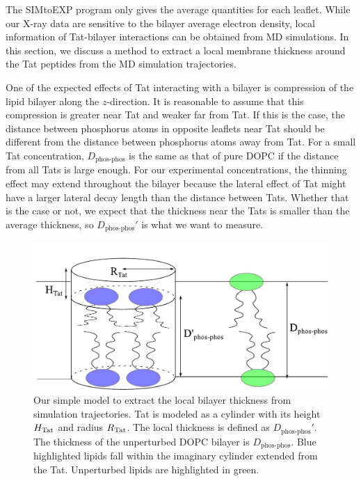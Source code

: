 The SIMtoEXP program only gives the average quantities for each leaflet. 
While our X-ray data are sensitive to the bilayer average electron density,
local information of Tat-bilayer interactions can be obtained from MD simulations.
In this section, we discuss a method to extract a local membrane thickness
around the Tat peptides from the MD simulation trajectories. 

One of the expected effects of Tat interacting with a bilayer is 
compression of the lipid bilayer along the $z$-direction. It is 
reasonable to assume that this compression is greater near Tat and
weaker far from Tat.
If this is the case, the distance between phosphorus atoms in opposite
leaflets near Tat should be different from the distance between
phosphorus atoms away from Tat.  
For a small Tat concentration, $D_\textrm{phos-phos}$ is the same as that of 
pure DOPC if the distance from all Tats is large enough.  
For our experimental concentrations, the thinning effect may extend throughout 
the bilayer because the lateral effect of Tat might have a larger lateral decay 
length than the distance between Tats. Whether that is the case or not, we 
expect that the thickness near the Tats is smaller than the average thickness,
so $D_\textrm{phos-phos}'$ is what we want to measure. 

\begin{figure}[htbp]
  \centering
  \includegraphics[scale=0.5]{./figures/Tat/cylinder_model}
  \caption{Our simple model to extract the local bilayer thickness from 
  simulation trajectories. Tat is modeled as a cylinder with its height $H_\textrm{Tat}$ 
  and radius $R_\textrm{Tat}$. The local thickness is defined as $D_\textrm{phos-phos}'$. 
  The thickness of the unperturbed DOPC bilayer is $D_\textrm{phos-phos}$. 
  Blue highlighted lipids fall within the imaginary cylinder extended from
  the Tat. Unperturbed lipids are highlighted in green.}
  \label{fig:cylinder_model}
\end{figure}
 
